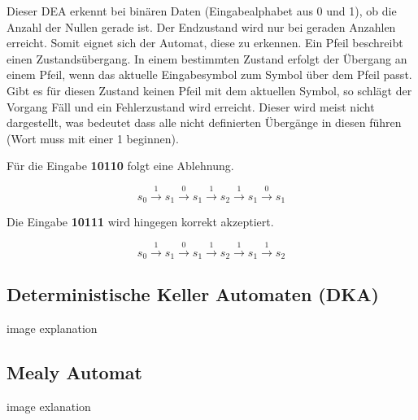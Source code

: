 Dieser DEA erkennt bei binären Daten (Eingabealphabet aus 0 und 1), ob die Anzahl
der Nullen gerade ist. Der Endzustand wird nur bei geraden Anzahlen erreicht.
Somit eignet sich der Automat, diese zu erkennen.
Ein Pfeil beschreibt einen Zustandsübergang. In einem bestimmten Zustand erfolgt
der Übergang an einem Pfeil, wenn das aktuelle Eingabesymbol zum Symbol über dem Pfeil passt.
Gibt es für diesen Zustand keinen Pfeil mit dem aktuellen Symbol, so schlägt der Vorgang
Fäll und ein Fehlerzustand wird erreicht. Dieser wird meist nicht dargestellt, was bedeutet
dass alle nicht definierten Übergänge in diesen führen (Wort muss mit einer 1 beginnen).

\clearpage

Für die Eingabe \textbf{10110} folgt eine Ablehnung.

\Large
\begin{equation*}
    s_0 \overset{1}{\rightarrow} s_1 \overset{0}{\rightarrow} s_1 \overset{1}{\rightarrow}
    s_2 \overset{1}{\rightarrow} s_1 \overset{0}{\rightarrow} s_1 
\end{equation*}
\normalsize

Die Eingabe \textbf{10111} wird hingegen korrekt akzeptiert.

\vspace*{-0.9cm}

\Large
\begin{equation*}
    s_0 \overset{1}{\rightarrow} s_1 \overset{0}{\rightarrow} s_1 \overset{1}{\rightarrow}
    s_2 \overset{1}{\rightarrow} s_1 \overset{1}{\rightarrow} s_2 
\end{equation*}
\normalsize

\subsection{Deterministische Keller Automaten (DKA)}

image
explanation

\subsection{Mealy Automat}

image
exlanation
